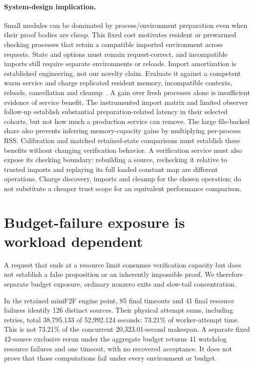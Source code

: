 \documentclass[10pt,twocolumn]{article}
\begin{document}
\paragraph{System-design implication.}
Small modules can be dominated by process/environment preparation even when
their proof bodies are cheap. This fixed cost motivates resident or prewarmed
checking processes that retain a compatible imported environment across
requests. State and options must remain request-correct, and incompatible
imports still require separate environments or reloads.
Import amortization is established engineering, not our novelty claim.
Evaluate it against a competent warm service and charge replicated resident
memory, incompatible contexts, reloads, cancellation and cleanup~\cite{fork}.
A gain over fresh processes alone is insufficient evidence of service benefit.
The instrumented import matrix and limited observer follow-up establish
substantial preparation-related latency in their selected cohorts, but not
how much a production service can remove. The large file-backed share also prevents inferring memory-capacity
gains by multiplying per-process RSS. Calibration and matched retained-state
comparisons must establish these benefits without changing verification
behavior.
A verification service must also expose its checking boundary: rebuilding a
source, rechecking it relative to trusted imports and replaying its full
loaded constant map are different operations.
Charge discovery, imports and cleanup for the chosen operation; do not
substitute a cheaper trust scope for an equivalent performance comparison.

\section{Budget-failure exposure is workload dependent}
\label{sec:failures}
A request that ends at a resource limit consumes verification capacity but
does not establish a false proposition or an inherently impossible proof.
We therefore separate budget exposure, ordinary nonzero exits and slow-tail
concentration.

In the retained miniF2F engine point, 85 final timeouts and 41 final
resource failures identify 126 distinct sources.
Their physical attempt sums, including retries, total 38,795.133 of
52,992.124 seconds: 73.21\% of worker-attempt time.
This is not 73.21\% of the concurrent 20,323.01-second makespan.
A separate fixed 42-source exclusive rerun under the aggregate budget returns
41 watchdog resource failures and one timeout, with no recovered acceptance.
It does not prove that those computations fail under every environment or
budget.
\end{document}
